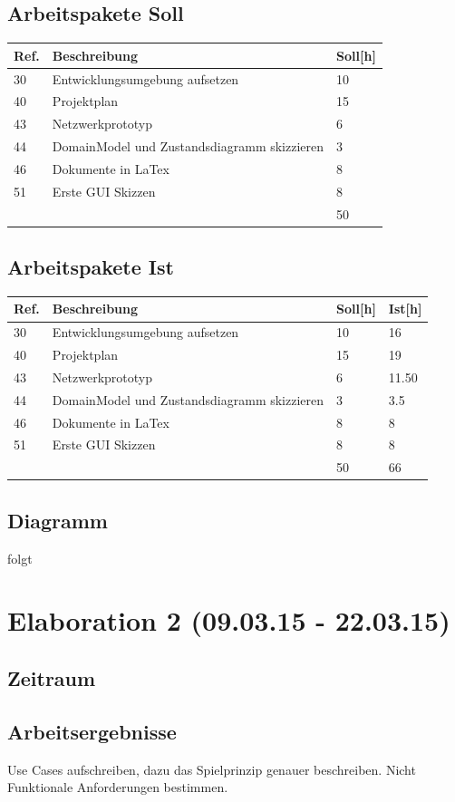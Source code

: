 \documentclass[11pt]{scrartcl}
\begin{document}
\subsection{Arbeitspakete Soll}
  \begin{tabularx} {\linewidth}{lXl}
    \bf{Ref.}  & \bf{Beschreibung} & \bf{Soll[h]} \\
    \hline
    30 & Entwicklungsumgebung aufsetzen & 10 \\
    40 & Projektplan & 15 \\
    43 & Netzwerkprototyp & 6 \\
    44 & DomainModel und Zustandsdiagramm skizzieren & 3 \\
    46 & Dokumente in LaTex & 8 \\
    51 & Erste GUI Skizzen & 8 \\
    \hline
    & & 50
  \end{tabularx}
  
  \subsection{Arbeitspakete Ist}
  \begin{tabularx} {\linewidth}{lXll}
    \bf{Ref.}  & \bf{Beschreibung} & \bf{Soll[h]}  & \bf{Ist[h]}\\
    \hline
    30 & Entwicklungsumgebung aufsetzen & 10 & 16 \\
    40 & Projektplan & 15 & 19\\
    43 & Netzwerkprototyp & 6 & 11.50\\
    44 & DomainModel und Zustandsdiagramm skizzieren & 3 & 3.5 \\
    46 & Dokumente in LaTex & 8 & 8\\
    51 & Erste GUI Skizzen & 8 & 8\\
    \hline
    & & 50 & 66
    \end{tabularx}
    
    
    \subsection{Diagramm}
    folgt
\section{Elaboration 2 (09.03.15 - 22.03.15)}
\subsection{Zeitraum}
\subsection{Arbeitsergebnisse}
Use Cases aufschreiben, dazu das Spielprinzip genauer beschreiben. 
Nicht Funktionale Anforderungen bestimmen.
\end{document}
